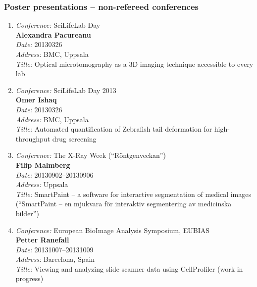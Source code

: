 \subsubsection{ Poster presentations -- non-refereed conferences}
\begin{enumerate}
\item 
{\em Conference:} SciLifeLab Day~\\
{\bf Alexandra Pacureanu}~\\
{\em Date:} 20130326~\\
{\em Address:} BMC, Uppsala~\\
{\em Title:} Optical microtomography as a 3D imaging technique accessible to every lab

\item
{\em Conference:} SciLifeLab Day 2013~\\
{\bf Omer Ishaq}~\\
{\em Date:} 20130326~\\
{\em Address:} BMC, Uppsala~\\
{\em Title:} Automated quantification of Zebrafish tail deformation for high-throughput drug screening

\item 
{\em Conference:} The X-Ray Week (``R\"{o}ntgenveckan'')~\\
{\bf Filip Malmberg}~\\
{\em Date:} 20130902--20130906~\\
{\em Address:} Uppsala~\\
{\em Title:} SmartPaint -- a software for interactive segmentation of medical images (``SmartPaint -- en mjukvara f\"{o}r interaktiv segmentering av medicinska  bilder'')


\item 
{\em Conference:} European BioImage Analysis Symposium, EUBIAS~\\
{\bf Petter Ranefall}~\\
{\em Date:} 20131007--20131009~\\
{\em Address:} Barcelona, Spain~\\
{\em Title:} Viewing and analyzing slide scanner data using CellProfiler (work in progress)

\end{enumerate}

